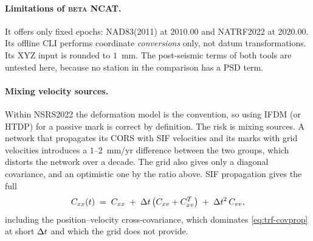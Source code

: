 \documentclass[main.tex]{subfiles}
\begin{document}
\paragraph{Limitations of \textsc{beta} NCAT.}  It offers only fixed
epochs: NAD83(2011) at $2010.00$ and NATRF2022 at $2020.00$.  Its
offline CLI performs coordinate \emph{conversions} only, not datum
transformations.  Its XYZ input is rounded to $1$~mm.  The post-seismic
terms of both tools are untested here, because no station in the
comparison has a PSD term.

\paragraph{Mixing velocity sources.}  Within NSRS2022 the deformation
model is the convention, so using IFDM (or HTDP) for a passive mark is
correct by definition.  The risk is mixing sources.  A network that
propagates its CORS with SIF velocities and its marks with grid
velocities introduces a $1$--$2$~mm/yr difference between the two
groups, which distorts the network over a decade.  The grid also gives
only a diagonal covariance, and an optimistic one by the ratio above.
SIF propagation gives the full
\begin{equation}
C_{xx}(t) \;=\; C_{xx}
   \;+\; \Delta t\,\bigl(C_{xv} + C_{xv}^{T}\bigr)
   \;+\; \Delta t^{2}\,C_{vv},
\label{eq:trf-covprop}
\end{equation}
including the position--velocity cross-covariance, which dominates
\eqref{eq:trf-covprop} at short $\Delta t$ and which the grid does not
provide.

\ifSubfilesClassLoaded{\printbibliography}{}
\end{document}
